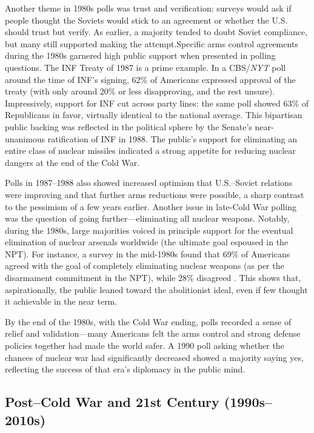 \documentclass[11,5 pt]{article}
\begin{document}
    Another theme in 1980s polls was trust and verification: surveys would ask if people thought the Soviets would stick to an agreement or whether the U.S. should trust but verify. As earlier, a majority tended to doubt Soviet compliance, but many still supported making the attempt.Specific arms control agreements during the 1980s garnered high public support when presented in polling questions. The INF Treaty of 1987 is a prime example. In a CBS/\textit{NYT} poll around the time of INF’s signing, 62\% of Americans expressed approval of the treaty (with only around 20\% or less disapproving, and the rest unsure). Impressively, support for INF cut across party lines: the same poll showed 63\% of Republicans in favor, virtually identical to the national average. This bipartisan public backing was reflected in the political sphere by the Senate’s near-unanimous ratification of INF in 1988. The public’s support for eliminating an entire class of nuclear missiles indicated a strong appetite for reducing nuclear dangers at the end of the Cold War. 
    
    Polls in 1987–1988 also showed increased optimism that U.S.–Soviet relations were improving and that further arms reductions were possible, a sharp contrast to the pessimism of a few years earlier. Another issue in late-Cold War polling was the question of going further—eliminating all nuclear weapons. Notably, during the 1980s, large majorities voiced in principle support for the eventual elimination of nuclear arsenals worldwide (the ultimate goal espoused in the NPT). For instance, a survey in the mid-1980s found that 69\% of Americans agreed with the goal of completely eliminating nuclear weapons (as per the disarmament commitment in the NPT), while 28\% disagreed \cite{CDI2002}. This shows that, aspirationally, the public leaned toward the abolitionist ideal, even if few thought it achievable in the near term. 
    
    By the end of the 1980s, with the Cold War ending, polls recorded a sense of relief and validation—many Americans felt the arms control and strong defense policies together had made the world safer. A 1990 poll asking whether the chances of nuclear war had significantly decreased showed a majority saying yes, reflecting the success of that era’s diplomacy in the public mind.


\subsection*{Post–Cold War and 21st Century (1990s–2010s)}
\end{document}
